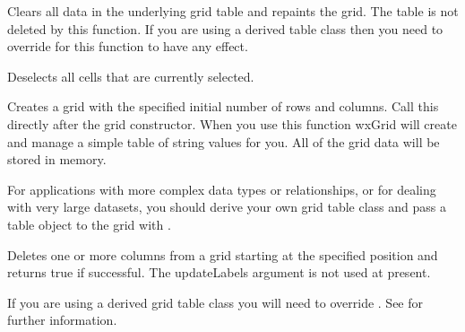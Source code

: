 \label{wxgridcleargrid}


Clears all data in the underlying grid table and repaints the grid. The table is not deleted by
this function. If you are using a derived table class then you need to override
 for this function to have any effect.



\label{wxgridclearselection}


Deselects all cells that are currently selected.



\label{wxgridcreategrid}


Creates a grid with the specified initial number of rows and columns.
Call this directly after the grid constructor. When you use this
function wxGrid will create and manage a simple table of string values
for you. All of the grid data will be stored in memory.

For applications with more complex data types or relationships, or for
dealing with very large datasets, you should derive your own grid table
class and pass a table object to the grid with .



\label{wxgriddeletecols}


Deletes one or more columns from a grid starting at the specified position and returns
true if successful. The updateLabels argument is not used at present.

If you are using a derived grid table class you will need to override
. See
 for further information.



\label{wxgriddeleterows}


